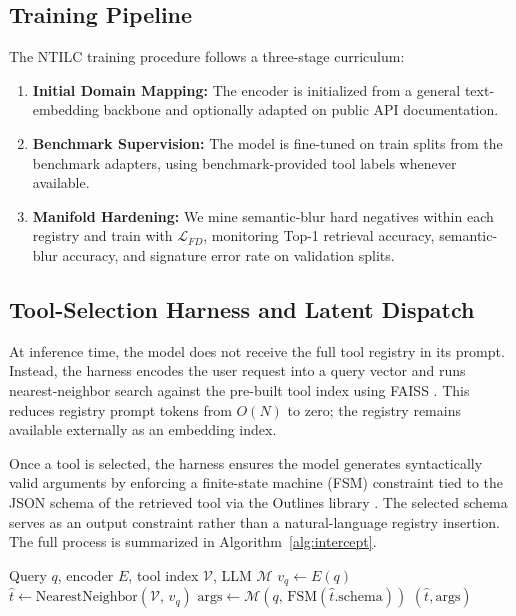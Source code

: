 \documentclass{article}
\begin{document}
\subsection{Training Pipeline}

The NTILC training procedure follows a three-stage curriculum:
\begin{enumerate}[leftmargin=*,nosep]
    \item \textbf{Initial Domain Mapping:} The encoder is initialized from a general text-embedding backbone and optionally adapted on public API documentation.
    \item \textbf{Benchmark Supervision:} The model is fine-tuned on train splits from the benchmark adapters, using benchmark-provided tool labels whenever available.
    \item \textbf{Manifold Hardening:} We mine semantic-blur hard negatives within each registry and train with $\mathcal{L}_{FD}$, monitoring Top-1 retrieval accuracy, semantic-blur accuracy, and signature error rate on validation splits.
\end{enumerate}

\subsection{Tool-Selection Harness and Latent Dispatch}

At inference time, the model does not receive the full tool registry in its prompt.
Instead, the harness encodes the user request into a query vector and runs nearest-neighbor search against the pre-built tool index using FAISS \cite{johnson2017billionscalesimilaritysearchgpus, douze2025faisslibrary}.
This reduces registry prompt tokens from $O(N)$ to zero; the registry remains available externally as an embedding index.

Once a tool is selected, the harness ensures the model generates syntactically valid arguments by enforcing a finite-state machine (FSM) constraint tied to the JSON schema of the retrieved tool via the Outlines library \cite{willard2023efficientguidedgenerationlarge}.
The selected schema serves as an output constraint rather than a natural-language registry insertion.
The full process is summarized in Algorithm~\ref{alg:intercept}.

\begin{algorithm}
\caption{NTILC Tool-Selection Loop}
\label{alg:intercept}
\begin{algorithmic}[1]
\Require Query $q$, encoder $E$, tool index $\mathcal{V}$, LLM $\mathcal{M}$
\State $v_q \leftarrow E(q)$ 
\State $\hat{t} \leftarrow \text{NearestNeighbor}(\mathcal{V},\, v_q)$ 
\State $\text{args} \leftarrow \mathcal{M}(q,\, \text{FSM}(\hat{t}.\text{schema}))$ 
\State \Return $(\hat{t}, \text{args})$
\end{algorithmic}
\end{algorithm}
\end{document}
